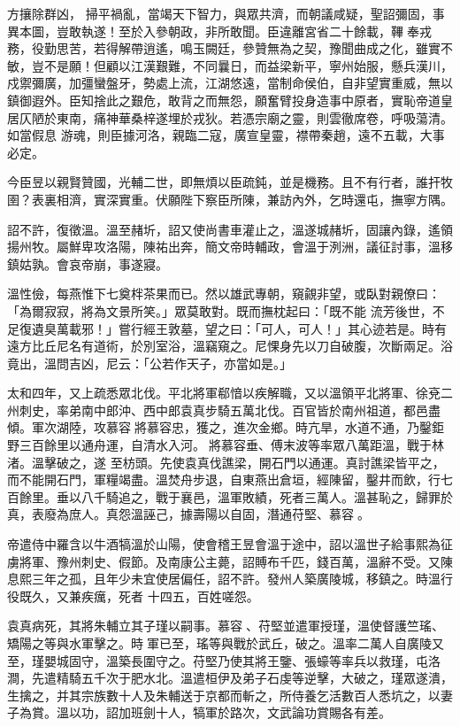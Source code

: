 \begin{pinyinscope}
 方攘除群凶，
 掃平禍亂，當竭天下智力，與眾共濟，而朝議咸疑，聖詔彌固，事異本圖，豈敢執遂！至於入參朝政，非所敢聞。臣違離宮省二十餘載，鞸奉戎務，役勤思苦，若得解帶逍遙，鳴玉闕廷，參贊無為之契，豫聞曲成之化，雖實不敏，豈不是願！但顧以江漢艱難，不同曩日，而益梁新平，寧州始服，懸兵漢川，戍禦彌廣，加彊蠻盤牙，勢處上流，江湖悠遠，當制命侯伯，自非望實重威，無以鎮御遐外。臣知捨此之艱危，敢背之而無怨，願奮臂投身造事中原者，實恥帝道皇居仄陋於東南，痛神華桑梓遂埋於戎狄。若憑宗廟之靈，則雲徹席卷，呼吸蕩清。如當假息
 游魂，則臣據河洛，親臨二寇，廣宣皇靈，襟帶秦趙，遠不五載，大事必定。



 今臣昱以親賢贊國，光輔二世，即無煩以臣疏鈍，並是機務。且不有行者，誰扞牧圉？表裏相濟，實深實重。伏願陛下察臣所陳，兼訪內外，乞時還屯，撫寧方隅。



 詔不許，復徵溫。溫至赭圻，詔又使尚書車灌止之，溫遂城赭圻，固讓內錄，遙領揚州牧。屬鮮卑攻洛陽，陳祐出奔，簡文帝時輔政，會溫于洌洲，議征討事，溫移鎮姑孰。會哀帝崩，事遂寢。



 溫性儉，每燕惟下七奠柈茶果而已。然以雄武專朝，窺覦非望，或臥對親僚曰：「為爾寂寂，將為文景所笑。」眾莫敢對。既而撫枕起曰：「既不能
 流芳後世，不足復遺臭萬載邪！」嘗行經王敦墓，望之曰：「可人，可人！」其心迹若是。時有遠方比丘尼名有道術，於別室浴，溫竊窺之。尼惈身先以刀自破腹，次斷兩足。浴竟出，溫問吉凶，尼云：「公若作天子，亦當如是。」



 太和四年，又上疏悉眾北伐。平北將軍郗愔以疾解職，又以溫領平北將軍、徐兗二州刺史，率弟南中郎沖、西中郎袁真步騎五萬北伐。百官皆於南州祖道，都邑盡傾。軍次湖陸，攻慕容將慕容忠，獲之，進次金鄉。時亢旱，水道不通，乃鑿鉅野三百餘里以通舟運，自清水入河。將慕容垂、傅末波等率眾八萬距溫，戰于林渚。溫擊破之，遂
 至枋頭。先使袁真伐譙梁，開石門以通運。真討譙梁皆平之，而不能開石門，軍糧竭盡。溫焚舟步退，自東燕出倉垣，經陳留，鑿井而飲，行七百餘里。垂以八千騎追之，戰于襄邑，溫軍敗績，死者三萬人。溫甚恥之，歸罪於真，表廢為庶人。真怨溫誣己，據壽陽以自固，潛通苻堅、慕容。



 帝遣侍中羅含以牛酒犒溫於山陽，使會稽王昱會溫于途中，詔以溫世子給事熙為征虜將軍、豫州刺史、假節。及南康公主薨，詔賻布千匹，錢百萬，溫辭不受。又陳息熙三年之孤，且年少未宜使居偏任，詔不許。發州人築廣陵城，移鎮之。時溫行役既久，又兼疾癘，死者
 十四五，百姓嗟怨。



 袁真病死，其將朱輔立其子瑾以嗣事。慕容、苻堅並遣軍授瑾，溫使督護竺瑤、矯陽之等與水軍擊之。時軍已至，瑤等與戰於武丘，破之。溫率二萬人自廣陵又至，瑾嬰城固守，溫築長圍守之。苻堅乃使其將王鑒、張蠔等率兵以救瑾，屯洛澗，先遣精騎五千次于肥水北。溫遣桓伊及弟子石虔等逆擊，大破之，瑾眾遂潰，生擒之，并其宗族數十人及朱輔送于京都而斬之，所侍養乞活數百人悉坑之，以妻子為賞。溫以功，詔加班劍十人，犒軍於路次，文武論功賞賜各有差。




\end{pinyinscope}
